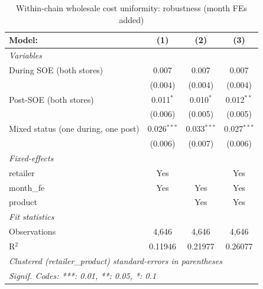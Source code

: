 
\begin{table}[htbp]
   \caption{\label{tab:uniformity_wholesale_robust} Within-chain wholesale cost uniformity: robustness (month FEs added)}
   \centering
   \begin{tabular}{lccc}
      \tabularnewline \midrule \midrule
      Model:                              & (1)           & (2)           & (3)\\  
      \midrule
      \emph{Variables}\\
      During SOE (both stores)            & 0.007         & 0.007         & 0.007\\   
                                          & (0.004)       & (0.004)       & (0.004)\\   
      Post-SOE (both stores)              & 0.011$^{*}$   & 0.010$^{*}$   & 0.012$^{**}$\\   
                                          & (0.006)       & (0.005)       & (0.005)\\   
      Mixed status (one during, one post) & 0.026$^{***}$ & 0.033$^{***}$ & 0.027$^{***}$\\   
                                          & (0.006)       & (0.007)       & (0.006)\\   
      \midrule
      \emph{Fixed-effects}\\
      retailer                            & Yes           &               & Yes\\  
      month\_fe                           & Yes           & Yes           & Yes\\  
      product                             &               & Yes           & Yes\\  
      \midrule
      \emph{Fit statistics}\\
      Observations                        & 4,646         & 4,646         & 4,646\\  
      R$^2$                               & 0.11946       & 0.21977       & 0.26077\\  
      \midrule \midrule
      \multicolumn{4}{l}{\emph{Clustered (retailer\_product) standard-errors in parentheses}}\\
      \multicolumn{4}{l}{\emph{Signif. Codes: ***: 0.01, **: 0.05, *: 0.1}}\\
   \end{tabular}
   

\end{table}
